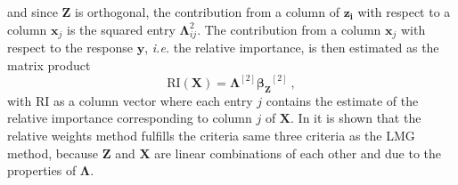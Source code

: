 and since $\mathbf{Z}$ is orthogonal, the contribution from a column of $\mathbf{z_i}$ with respect to a column $\mathbf{x}_j$ is the squared entry $\boldsymbol{\Lambda}_{ij}^2$.
The contribution from a column $\mathbf{x}_j$ with respect to the response $\mathbf{y}$, \textit{i.e.} the relative importance, is then estimated as the matrix product \citep{johnson_relative_weights}
\begin{equation}
    \label{eq:RI_lambda}
    \text{RI}(\mathbf{X}) = \boldsymbol{\Lambda}^{[2]} \boldsymbol{\beta_Z}^{[2]} \ , 
\end{equation}
with $\text{RI}$ as a column vector where each entry $j$ contains the estimate of the relative importance corresponding to column $j$ of $\mathbf{X}$.
In \citet[section 2.5.3]{matre} it is shown that the relative weights method fulfills the criteria same three criteria as the LMG method, because $\mathbf{Z}$ and $\mathbf{X}$ are linear combinations of each other and due to the properties of $\boldsymbol{\Lambda}$.



